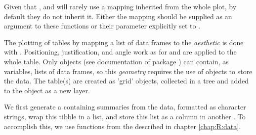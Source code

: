 \documentclass[krantz2]{krantz}\usepackage{knitr}
\begin{document}
\begin{warningbox}
Given that  ,  and  will rarely use a mapping inherited from the whole plot, by default they do not inherit it. Either the mapping should be supplied as an argument to these functions or their parameter  explicitly set to .
\end{warningbox}

The plotting of tables by mapping a list of data frames to the  \emph{aesthetic} is done with . Positioning, justification, and angle work as for  and are applied to the whole table. Only  objects (see documentation of package ) can contain, as variables, lists of data frames, so this \emph{geometry} requires the use of  objects to store the data. The table(s) are created as 'grid'  objects, collected in a tree and added to the  object as a new layer.

We first generate a  containing summaries from the data, formatted as character strings, wrap this tibble in a list, and store this list as a column in another . To accomplish this, we use functions from the  described in chapter \ref{chap:R:data}.

\begin{knitrout}\footnotesize
{}\color{fgcolor}
\end{knitrout}
\end{document}

